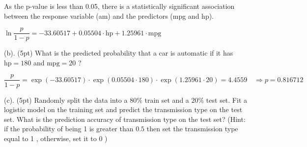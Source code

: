 \documentclass{article}\usepackage[]{graphicx}\usepackage[]{color}
\begin{document}
As the p-value is less than 0.05, there is a statistically significant association between the response variable (am) and the predictors (mpg and hp).

$\ln \dfrac{p}{1-p} = -33.60517 + 0.05504 \cdot \mathrm{hp} + 1.25961 \cdot \mathrm{mpg}$

\vspace*{0.5cm}

(b). (5pt) What is the predicted probability that a car is automatic if it has $\mathrm{hp}=180$ and $\mathrm{mpg}=20$ ? 

\vspace*{0.5cm}
$\dfrac{p}{1-p} = \exp(-33.60517) \cdot \exp(0.05504 \cdot 180) \cdot \exp(1.25961 \cdot 20) = 4.4559 \quad \Rightarrow p = 0.816712$
\vspace*{0.5cm}


(c). (5pt) Randomly split the data into a $80 \%$ train set and a $20 \%$ test set. Fit a logistic model on the training set and predict the transmission type on the test set. What is the prediction accuracy of transmission type on the test set? (Hint: if the probability of being 1 is greater than $0.5$ then set the transmission type equal to 1 , otherwise, set it to 0 )

\vspace*{0.5cm}
\end{document}
